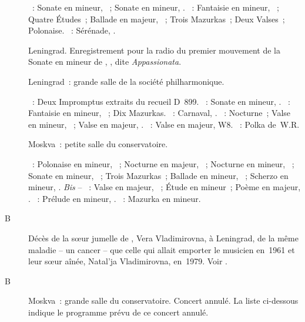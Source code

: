 \begin{description}
 \textsc{\Beethoven{}}~: Sonate en \kF mineur, ~; Sonate en \kC
 mineur, .
 \textsc{\Chopin{}}~: Fantaisie en \kF mineur, ~; Quatre Études~;
 Ballade en \kA \Flat majeur, ~; Trois Mazurkas~; Deux Valses~;
 Polonaise.
 \textsc{\Rachmaninov{}}~: Sérénade,  .
 \item[\DateWithWeekDay{1948-10-29}]
 Leningrad.
 Enregistrement pour la radio du premier mouvement de la Sonate en \kF
 mineur de \Beethoven{}, , dite \emph{Appassionata}.
 \item[\DateWithWeekDay{1948-11-03}]
 Leningrad~: grande salle de la société philharmonique.

 \textsc{\Schubert{}}~: Deux Impromptus extraits du recueil D~899.
 \textsc{\Beethoven{}}~: Sonate en \kC \Sharp mineur,  .
 \textsc{\Chopin{}}~: Fantaisie en \kF mineur, ~; Dix Mazurkas.
 \textsc{\Schumann{}}~: Carnaval, .
 \textsc{\Chopin{}}~: Nocturne~; Valse en \kC \Sharp mineur, 
 ~; Valse en \kA \Flat majeur,  .
 \textsc{\Scriabine{}}~: Valse en \kD \Flat majeur, W8.
 \textsc{\Rachmaninov{}}~: Polka de~W.R.
 \item[\DateWithWeekDay{1948-11-17}]
 Moskva~: petite salle du conservatoire.

 \textsc{\Chopin{}}~: Polonaise en \kC \Sharp mineur,  ~;
 Nocturne en \kF majeur,  ~; Nocturne en \kF \Sharp
 mineur,  ~; Sonate en \kB \Flat mineur, ~;
 Trois Mazurkas~; Ballade en \kG mineur, ~; Scherzo en \kB mineur,
 .
 \emph{Bis} -- \textsc{\Scriabine{}}~: Valse en \kA \Flat majeur,
 ~; Étude en \kB \Flat mineur~; Poème en \kF \Sharp majeur,
  .
 \textsc{\Rachmaninov{}}~: Prélude en \kG mineur,  .
 \textsc{\Chopin{}}~: Mazurka en \kA mineur.
 \item[B\DateWithWeekDay{1948-11-27}]
 Décès de la sœur jumelle de \VSofronitsky{}, Vera Vladimirovna, à
 Leningrad, de la même maladie -- un cancer -- que celle qui allait emporter
 le musicien en~1961 et leur sœur aînée, Natal'ja Vladimirovna, en~1979.
 Voir \citet[p.~118-119, note en bas de page]{Nikonovich08a}.
 \item[B\DateWithWeekDay{1948-11-29}]
 Moskva~: grande salle du conservatoire.
 Concert annulé.
 La liste ci-dessous indique le programme prévu de ce concert annulé.


\end{description}
